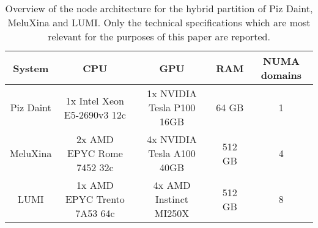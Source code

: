 \documentclass[main.tex]{subfiles}
\begin{document}
        \begin{table}[t!]
            \setlength\extrarowheight{2pt}
            \centering
            \begin{tabular}{|c|c|c|c|c|}
                 \hline
                 \textbf{System} & \textbf{CPU} & \textbf{GPU} & \textbf{RAM} & \textbf{NUMA domains} \\
                 \hline
                 Piz Daint & 1x Intel Xeon E5-2690v3 12c & 1x NVIDIA Tesla P100 16GB & 64 GB & 1 \\
                 MeluXina & 2x AMD EPYC Rome 7452 32c & 4x NVIDIA Tesla A100 40GB & 512 GB & 4 \\
                 LUMI & 1x AMD EPYC Trento 7A53 64c & 4x AMD Instinct MI250X & 512 GB & 8 \\
                 \hline
            \end{tabular}
            \vspace*{0.2cm}
            \caption{Overview of the node architecture for the hybrid partition of Piz Daint, MeluXina and LUMI. Only the technical specifications which are most relevant for the purposes of this paper are reported.}
            \label{tab:architecture}
        \end{table}
\end{document}
